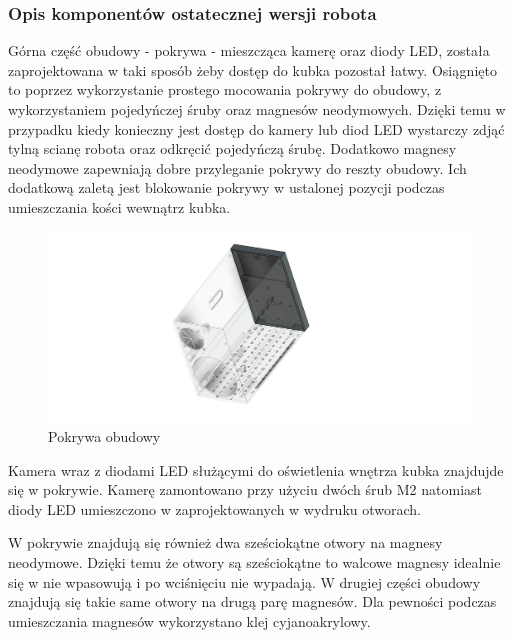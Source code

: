 \subsubsection{Opis komponentów ostatecznej wersji robota}

Górna część obudowy - pokrywa - mieszcząca kamerę oraz diody LED, została zaprojektowana w taki sposób żeby dostęp do kubka pozostał łatwy. Osiągnięto to
poprzez wykorzystanie prostego mocowania pokrywy do obudowy, z wykorzystaniem pojedyńczej śruby oraz magnesów neodymowych. Dzięki temu w przypadku kiedy konieczny 
jest dostęp do kamery lub diod LED wystarczy zdjąć tylną scianę robota oraz odkręcić pojedyńczą śrubę. Dodatkowo magnesy neodymowe zapewniają
dobre przyleganie pokrywy do reszty obudowy. Ich dodatkową zaletą jest blokowanie pokrywy w ustalonej pozycji podczas umieszczania kości wewnątrz
kubka.

\begin{figure}[H]
    \centering
    \includegraphics[width=0.95\linewidth]{chapters/03-praca-wlasna/figures/pokrywa.png}
    \caption{\label{fig:pokrywa}Pokrywa obudowy}
\end{figure}

Kamera wraz z diodami LED służącymi do oświetlenia wnętrza kubka znajdujde się w pokrywie. Kamerę zamontowano przy użyciu dwóch śrub M2 natomiast
diody LED umieszczono w zaprojektowanych w wydruku otworach.

W pokrywie znajdują się również dwa sześciokątne otwory na magnesy neodymowe. Dzięki temu że otwory są sześciokątne to walcowe magnesy idealnie
się w nie wpasowują i po wciśnięciu nie wypadają. W drugiej części obudowy znajdują się takie same otwory na drugą parę magnesów. Dla pewności podczas umieszczania magnesów 
wykorzystano klej cyjanoakrylowy.


